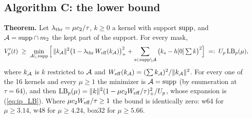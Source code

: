 \documentclass{article}
\numberwithin{equation}{section}   %
\begin{document}
\subsection{Algorithm C: the lower bound}
\label{sec:ip_lowerC}

{\bf Theorem.}  Let $\lambda_{\rm thr} = \mu c_2/\tau$, $k \ge 0$ a kernel with support ${\rm supp}$, and
${\cal A} = {\rm supp} \cap m_2$ the kept part of the support.  For every mask,
\begin{equation}
V'_p(t) \;\ge\; \min_{{\cal A} \subseteq {\rm supp}}
   \Big[\, \|k_{\cal A}\|^2 \big(1 - \lambda_{\rm thr}\,W_{\rm eff}(k_{\cal A})\big)_+^2
   + \sum_{s \in {\rm supp} \setminus {\cal A}} \big(k_s - h[0]\textstyle\sum k\big)^2 \Big]
   \;=:\; U_p\,{\rm LB}_p(\mu) ,
\label{eq:ip_LB_exact}
\end{equation}
where $k_{\cal A}$ is $k$ restricted to ${\cal A}$ and $W_{\rm eff}(k_{\cal A}) = (\sum k_{\cal A})^2/\|k_{\cal A}\|^2$.
For every one of the 16 kernels and every $\mu \ge 1$ the minimizer is ${\cal A} = {\rm supp}$ (by
enumeration at $\tau = 64$), and then
${\rm LB}_p(\mu) = \|k\|^2(1 - \mu c_2 W_{\rm eff}/\tau)_+^2/U_p$, whose expansion is (\ref{eq:ip_LB}).
Where $\mu c_2 W_{\rm eff}/\tau \ge 1$ the bound is identically zero: w64 for $\mu \ge 3.14$, w48 for
$\mu \ge 4.24$, box32 for $\mu \ge 5.66$.
\end{document}
